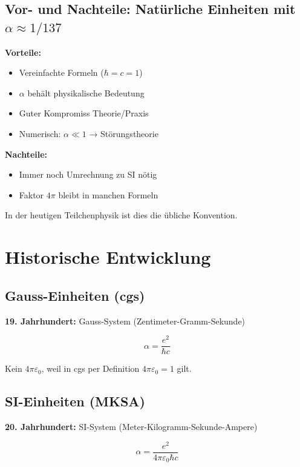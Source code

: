 	\subsection{Vor- und Nachteile: Natürliche Einheiten mit $\alpha \approx 1/137$}
	
	\textbf{Vorteile:}
	\begin{itemize}
		\item Vereinfachte Formeln ($\hbar = c = 1$)
		\item $\alpha$ behält physikalische Bedeutung
		\item Guter Kompromiss Theorie/Praxis
		\item Numerisch: $\alpha \ll 1$ → Störungstheorie
	\end{itemize}
	
	\textbf{Nachteile:}
	\begin{itemize}
		\item Immer noch Umrechnung zu SI nötig
		\item Faktor $4\pi$ bleibt in manchen Formeln
	\end{itemize}
	
	In der heutigen Teilchenphysik ist dies die übliche Konvention.
	
	\section{Historische Entwicklung}
	
	\subsection{Gauss-Einheiten (cgs)}
	
	\textbf{19. Jahrhundert:} Gauss-System (Zentimeter-Gramm-Sekunde)
	
	\begin{equation}
		\alpha = \frac{e^2}{\hbar c}
	\end{equation}
	
	Kein $4\pi\varepsilon_0$, weil in cgs per Definition $4\pi\varepsilon_0 = 1$ gilt.
	
	\subsection{SI-Einheiten (MKSA)}
	
	\textbf{20. Jahrhundert:} SI-System (Meter-Kilogramm-Sekunde-Ampere)
	
	\begin{equation}
		\alpha = \frac{e^2}{4\pi\varepsilon_0\hbar c}
	\end{equation}
	
